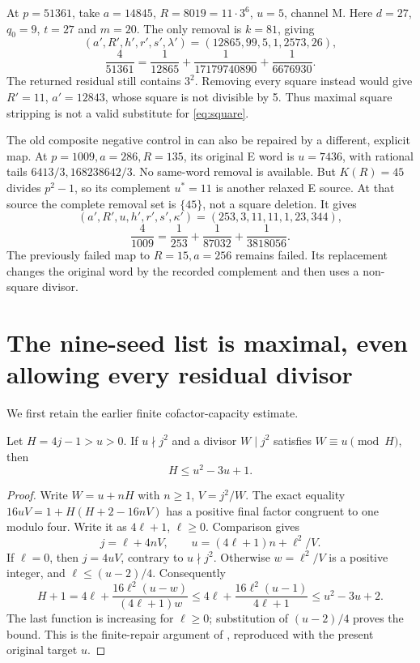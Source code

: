 At $p=51361$, take $a=14845$, $R=8019=11\cdot3^6$, $u=5$, channel M.
Here $d=27$, $q_0=9$, $t=27$ and $m=20$. The only removal is $k=81$, giving
\[
 (a',R',h',r',s',\lambda')=(12865,99,5,1,2573,26),
\]
\[
 \boxed{\frac4{51361}=\frac1{12865}+\frac1{17179740890}+\frac1{6676930}.}
\]
The returned residual still contains $3^2$. Removing every square instead
would give $R'=11$, $a'=12843$, whose square is not divisible by 5.
Thus maximal square stripping is not a valid substitute for \eqref{eq:square}.

The old composite negative control in \cite{PrimeTrace,Trace} can also be
repaired by a different, explicit map. At $p=1009,a=286,R=135$, its original
E word is $u=7436$, with rational tails $6413/3,168238642/3$.
No same-word removal is available. But $K(R)=45$ divides $p^2-1$, so its
complement $u^*=11$ is another relaxed E source. At that source the complete
removal set is $\{45\}$, not a square deletion. It gives
\[
 (a',R',u,h',r',s',\kappa')=(253,3,11,11,1,23,344),
\]
\[
 \boxed{\frac4{1009}=\frac1{253}+\frac1{87032}+\frac1{3818056}.}
\]
The previously failed map to $R=15,a=256$ remains failed. Its replacement changes
the original word by the recorded complement and then uses a non-square divisor.

\section{The nine-seed list is maximal, even allowing every residual divisor}
We first retain the earlier finite cofactor-capacity estimate.
\begin{lemma}\label{lem:cap}
Let $H=4j-1>u>0$. If $u\nmid j^2$ and a divisor $W\mid j^2$ satisfies
$W\equiv u\pmod H$, then
\begin{equation}\label{eq:cap}
 H\le u^2-3u+1.
\end{equation}
\end{lemma}
\begin{proof}
Write $W=u+nH$ with $n\ge1$, $V=j^2/W$. The exact equality
$16uV=1+H(H+2-16nV)$ has a positive final factor congruent to one modulo four.
Write it as $4\ell+1$, $\ell\ge0$. Comparison gives
\[
 j=\ell+4nV,\qquad u=(4\ell+1)n+\ell^2/V.
\]
If $\ell=0$, then $j=4uV$, contrary to $u\nmid j^2$. Otherwise
$w=\ell^2/V$ is a positive integer, and $\ell\le(u-2)/4$.
Consequently
\[
 H+1=4\ell+\frac{16\ell^2(u-w)}{(4\ell+1)w}
 \le4\ell+\frac{16\ell^2(u-1)}{4\ell+1}
 \le u^2-3u+2.
\]
The last function is increasing for $\ell\ge0$; substitution of $(u-2)/4$
proves the bound. This is the finite-repair argument of \cite{Capacity},
reproduced with the present original target $u$.
\end{proof}


